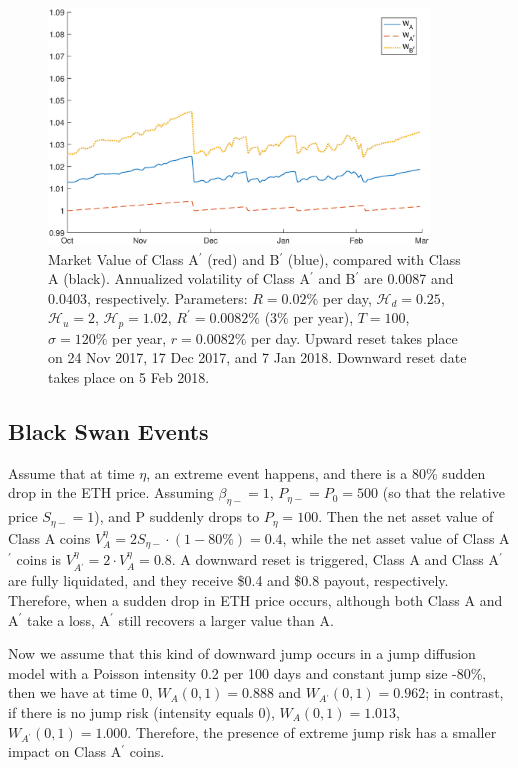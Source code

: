 \documentclass[final,pdftex]{ectaart}
\newcommand{\Ap}{A\ensuremath{^\prime}\xspace}
\theoremstyle{plain}
\begin{document}
\begin{figure}[h]
\centering
\includegraphics[width=0.9\textwidth]{WABpnoCI4.eps}
\caption{Market Value of Class A$^\prime$ (red) and B$^\prime$ (blue), compared with Class A (black). Annualized volatility of Class A$^\prime$ and B$^\prime$ are 0.0087 and 0.0403, respectively. Parameters: $R=0.02\%$ per day, $\mathcal{H}_{d}=0.25$, $\mathcal{H}_{u} =2$, $\mathcal{H}_{p}=1.02$, $R^\prime = 0.0082\%$ ($3\%$ per year), $T=100$, $\sigma= 120\%$ per year, $r=0.0082\%$ per day. Upward reset takes place on 24 Nov 2017, 17 Dec 2017, and 7 Jan 2018. Downward reset date takes place on 5 Feb 2018.}
\label{fig:valAPrime}
\end{figure}



\subsection{Black Swan Events}
Assume that at time $\eta$, an extreme event happens, and there is a 80\% sudden drop in the ETH price. Assuming $\beta_{\eta-} = 1$, $P_{\eta-} = P_0 = 500$ (so that the relative price $S_{\eta−} = 1$), and P suddenly drops to $P_\eta = 100$. Then the net asset value of Class A coins $V_A^\eta = 2S_{\eta-} \cdot(1-80\%) = 0.4$, while the net asset value of Class \Ap coins is $V^\eta_{\Ap} = 2 \cdot V^\eta_A = 0.8$. A downward reset is triggered, Class A and Class \Ap are fully liquidated, and they receive \$0.4 and \$0.8 payout, respectively. Therefore, when a sudden drop in ETH price occurs, although both Class A and \Ap take a loss, \Ap still recovers a larger value than A.

Now we assume that this kind of downward jump occurs in a jump diffusion model with a Poisson intensity 0.2 per 100 days and constant jump size -80\%, then we have at time 0, $W_A(0,1) = 0.888$ and $W_{\Ap} (0,1) = 0.962$; in contrast, if there is no jump risk (intensity equals 0), $W_A(0,1) = 1.013$, $W_{\Ap} (0,1) = 1.000$. Therefore, the presence of extreme jump risk has a smaller impact on Class \Ap coins.
\end{document}
